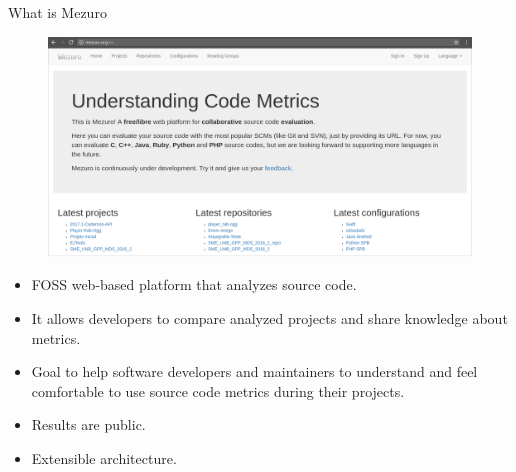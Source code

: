 \begin{block}{What is Mezuro}
    \begin{figure}
        \begin{center}
            \includegraphics[width=\textwidth]{figures/MezuroHome.png}
            \label{fig:feature1}
        \end{center}
    \end{figure}

    \begin{itemize}
        \item FOSS web-based platform that analyzes source code.

        \item It allows developers to compare analyzed projects and share
            knowledge about metrics.

        \item Goal to help software developers and maintainers to understand
            and feel comfortable to use source code metrics during their projects.

        \item Results are public.

        \item Extensible architecture.

    \end{itemize}
\end{block}
